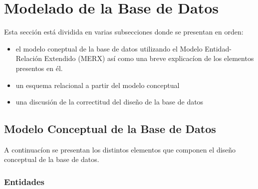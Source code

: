 \documentclass{article}
\begin{document}
\section{Modelado de la Base de Datos}
Esta sección está dividida en varias subsecciones donde se presentan en orden:
\begin{itemize}
\item el modelo coneptual de la base de datos utilizando el Modelo Entidad-Relación Extendido (MERX) así como una breve explicacíon de los elementos presentos en él.
\item un esquema relacional a partir del modelo conceptual
\item una discusión de la correctitud del diseño de la base de datos
\end{itemize}
\subsection{Modelo Conceptual de la Base de Datos}
A continuacíon se presentan los distintos elementos que componen el diseño conceptual de la base de datos.

\subsubsection{Entidades}
\end{document}
